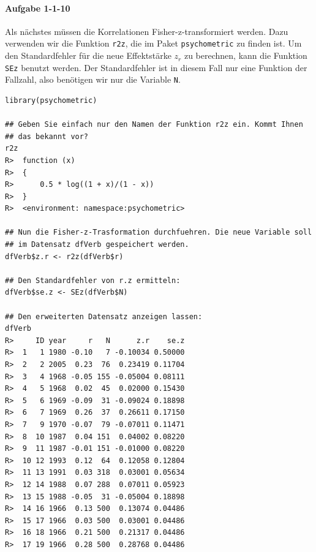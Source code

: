 \documentclass[normalheadings, 10pt]{scrartcl}\usepackage{graphicx, color}
\makeatletter
\newenvironment{kframe}{%
 \def\at@end@of@kframe{}%
 \ifinner\ifhmode%
  \def\at@end@of@kframe{\end{minipage}}%
  \begin{minipage}{\columnwidth}%
 \fi\fi%
 \def\FrameCommand##1{\hskip\@totalleftmargin \hskip-\fboxsep
 \colorbox{shadecolor}{##1}\hskip-\fboxsep
     \hskip-\linewidth \hskip-\@totalleftmargin \hskip\columnwidth}%
 \MakeFramed {\advance\hsize-\width
   \@totalleftmargin\z@ \linewidth\hsize
   \@setminipage}}%
 {\par\unskip\endMakeFramed%
 \at@end@of@kframe}
\newenvironment{knitrout}{}{} %
\newcommand{\code}[1]{\texttt{#1}}
\makeatother
\begin{document}
\paragraph{Aufgabe 1-1-10} Als nächstes müssen die Korrelationen
Fisher-z-transformiert werden. Dazu verwenden wir die Funktion \code{r2z}, die
im Paket \code{psychometric} zu finden ist. Um den Standardfehler für die neue
Effektstärke $z_r$ zu berechnen, kann die Funktion \code{SEz} benutzt
werden. Der Standardfehler ist in diesem Fall nur eine Funktion der Fallzahl,
also benötigen wir nur die Variable \code{N}.

\begin{rbsp}
\begin{knitrout}
\color{fgcolor}\begin{kframe}
\begin{verbatim}
library(psychometric)

## Geben Sie einfach nur den Namen der Funktion r2z ein. Kommt Ihnen
## das bekannt vor?
r2z
R>  function (x) 
R>  {
R>      0.5 * log((1 + x)/(1 - x))
R>  }
R>  <environment: namespace:psychometric>

## Nun die Fisher-z-Trasformation durchfuehren. Die neue Variable soll
## im Datensatz dfVerb gespeichert werden.
dfVerb$z.r <- r2z(dfVerb$r)

## Den Standardfehler von r.z ermitteln:
dfVerb$se.z <- SEz(dfVerb$N)

## Den erweiterten Datensatz anzeigen lassen:
dfVerb
R>     ID year     r   N      z.r    se.z
R>  1   1 1980 -0.10   7 -0.10034 0.50000
R>  2   2 2005  0.23  76  0.23419 0.11704
R>  3   4 1968 -0.05 155 -0.05004 0.08111
R>  4   5 1968  0.02  45  0.02000 0.15430
R>  5   6 1969 -0.09  31 -0.09024 0.18898
R>  6   7 1969  0.26  37  0.26611 0.17150
R>  7   9 1970 -0.07  79 -0.07011 0.11471
R>  8  10 1987  0.04 151  0.04002 0.08220
R>  9  11 1987 -0.01 151 -0.01000 0.08220
R>  10 12 1993  0.12  64  0.12058 0.12804
R>  11 13 1991  0.03 318  0.03001 0.05634
R>  12 14 1988  0.07 288  0.07011 0.05923
R>  13 15 1988 -0.05  31 -0.05004 0.18898
R>  14 16 1966  0.13 500  0.13074 0.04486
R>  15 17 1966  0.03 500  0.03001 0.04486
R>  16 18 1966  0.21 500  0.21317 0.04486
R>  17 19 1966  0.28 500  0.28768 0.04486
\end{verbatim}
\end{kframe}
\end{knitrout}

\end{rbsp}

\pagebreak
\end{document}
